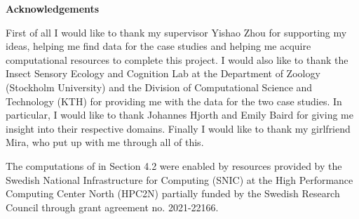 \newenvironment{acknowledgements}%
    {\cleardoublepage\thispagestyle{empty}\null\vfill\begin{center}%
    \bfseries Acknowledgements\end{center}}%
    {\vfill\null}
        \begin{acknowledgements}
          First of all I would like to thank my supervisor Yishao Zhou for supporting my ideas, helping me find data for the case studies and helping me acquire computational resources to complete this project. I would also  like to thank the Insect Sensory Ecology and Cognition Lab at the Department of Zoology (Stockholm University) and the Division of Computational Science and Technology (KTH) for providing me with the data for the two case studies. In particular, I would like to thank Johannes Hjorth and Emily Baird for giving me insight into their respective domains. Finally I would like to thank my girlfriend Mira, who put up with me through all of this.

          The computations of in Section 4.2 were enabled by resources provided by the Swedish National Infrastructure for Computing (SNIC) at the High Performance Computing Center North (HPC2N) partially funded by the Swedish Research Council through grant agreement no. 2021-22166.
        \end{acknowledgements}
